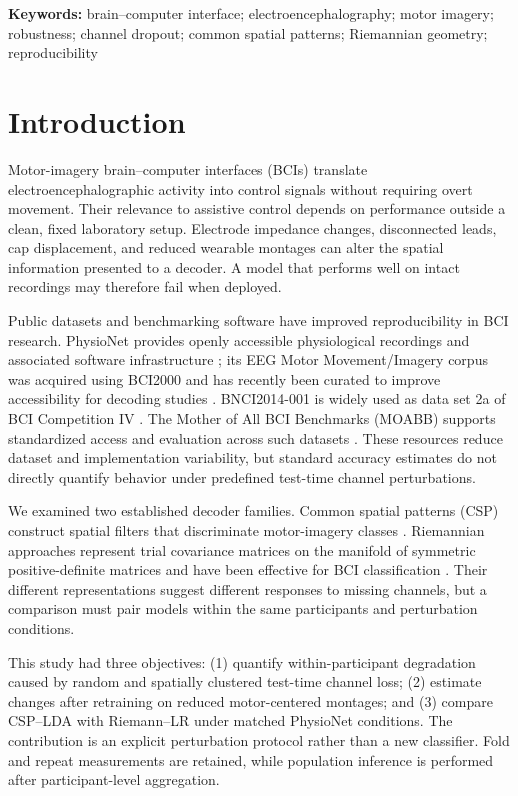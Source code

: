 \documentclass[11pt]{article}
\begin{document}
\noindent\textbf{Keywords:} brain--computer interface; electroencephalography; motor imagery; robustness; channel dropout; common spatial patterns; Riemannian geometry; reproducibility

\section{Introduction}
Motor-imagery brain--computer interfaces (BCIs) translate electroencephalographic activity into control signals without requiring overt movement. Their relevance to assistive control depends on performance outside a clean, fixed laboratory setup. Electrode impedance changes, disconnected leads, cap displacement, and reduced wearable montages can alter the spatial information presented to a decoder. A model that performs well on intact recordings may therefore fail when deployed.

Public datasets and benchmarking software have improved reproducibility in BCI research. PhysioNet provides openly accessible physiological recordings and associated software infrastructure \cite{Goldberger_2000}; its EEG Motor Movement/Imagery corpus was acquired using BCI2000 \cite{Schalk_2004} and has recently been curated to improve accessibility for decoding studies \cite{Shuqfa_2024}. BNCI2014-001 is widely used as data set 2a of BCI Competition IV \cite{Tangermann_2012}. The Mother of All BCI Benchmarks (MOABB) supports standardized access and evaluation across such datasets \cite{Jayaram_2018}. These resources reduce dataset and implementation variability, but standard accuracy estimates do not directly quantify behavior under predefined test-time channel perturbations.

We examined two established decoder families. Common spatial patterns (CSP) construct spatial filters that discriminate motor-imagery classes \cite{Ramoser_2000}. Riemannian approaches represent trial covariance matrices on the manifold of symmetric positive-definite matrices and have been effective for BCI classification \cite{Barachant_2012}. Their different representations suggest different responses to missing channels, but a comparison must pair models within the same participants and perturbation conditions.

This study had three objectives: (1) quantify within-participant degradation caused by random and spatially clustered test-time channel loss; (2) estimate changes after retraining on reduced motor-centered montages; and (3) compare CSP--LDA with Riemann--LR under matched PhysioNet conditions. The contribution is an explicit perturbation protocol rather than a new classifier. Fold and repeat measurements are retained, while population inference is performed after participant-level aggregation.
\end{document}
